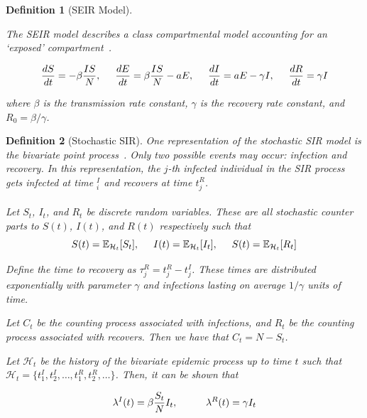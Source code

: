 \documentclass[12pt]{article}
\newtheorem{definition}{Definition}
\begin{document}
\begin{definition}[SEIR Model]\label{SEIR}

The SEIR model describes a class compartmental model accounting for an `exposed' compartment~\cite{Bertozzi2020}. 

\[
\frac{dS}{dt} = - \beta \frac{IS}{N}, \hspace{5mm}
\frac{dE}{dt} = \beta \frac{IS}{N} - a E, \hspace{5mm}
\frac{dI}{dt} = aE - \gamma I, \hspace{5mm}
\frac{dR}{dt} = \gamma I 
\]

where $\beta$ is the transmission rate constant, $\gamma$ is the recovery rate constant, and $R_0 = \beta/\gamma$. 
\end{definition}




\vspace{3mm}

\begin{definition}[Stochastic SIR]\label{stochastic-SIR}
One representation of the stochastic SIR model is the bivariate point process~\cite{Rizoiu2018}. Only two possible events may occur: infection and recovery. In this representation, the $j$-th infected individual in the SIR process gets infected at time $_i^I$ and recovers at time $t_j^R$. 
\\
\\
Let $S_t$, $I_t$, and $R_t$ be discrete random variables. These are all stochastic counter parts to $S(t)$, $I(t)$, and $R(t)$ respectively such that
\[
S(t) = \mathbb{E}_{\mathcal{H}_t} [ S_t ] , \hspace{5mm}
I(t) = \mathbb{E}_{\mathcal{H}_t} [ I_t ] , \hspace{5mm}
S(t) = \mathbb{E}_{\mathcal{H}_t} [ R_t ] 
\]


Define the time to recovery as $\tau_j^R = t_j^R - t_j^I$. These times are distributed exponentially with parameter $\gamma$ and infections lasting on average $1/\gamma$ units of time. 

Let $C_t$ be the counting process associated with infections, and $R_t$ be the counting process associated with recovers. Then we have that $C_t = N - S_t$. 

Let $\mathcal{H}_t$ be the history of the bivariate epidemic process up to time $t$ such that $\mathcal{H}_t = \{t_1^I, t_2^I, \ldots, t_1^R, t_2^R, \ldots \}$. Then, it can be shown that

\[
\lambda^I(t) = \beta \frac{S_t}{N} I_t, \hspace{10mm}
\lambda^R(t) = \gamma I_t
\]  
\end{definition}
\end{document}
